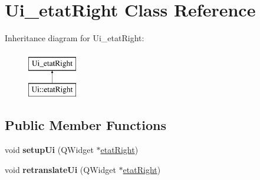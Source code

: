 \hypertarget{class_ui__etat_right}{\section{Ui\-\_\-etat\-Right Class Reference}
\label{class_ui__etat_right}
}
Inheritance diagram for Ui\-\_\-etat\-Right\-:\begin{figure}[H]
\begin{center}
\leavevmode
\includegraphics[height=2.000000cm]{class_ui__etat_right}
\end{center}
\end{figure}
\subsection*{Public Member Functions}
\begin{DoxyCompactItemize}
\item 
\hypertarget{class_ui__etat_right_a19c54fd43d646f353282bc374f4c1e8a}{void {\bfseries setup\-Ui} (Q\-Widget $\ast$\hyperlink{classetat_right}{etat\-Right})}\label{class_ui__etat_right_a19c54fd43d646f353282bc374f4c1e8a}

\item 
\hypertarget{class_ui__etat_right_ae20f3075c259ee0be56cd0af3111dca5}{void {\bfseries retranslate\-Ui} (Q\-Widget $\ast$\hyperlink{classetat_right}{etat\-Right})}\label{class_ui__etat_right_ae20f3075c259ee0be56cd0af3111dca5}

\end{DoxyCompactItemize}
